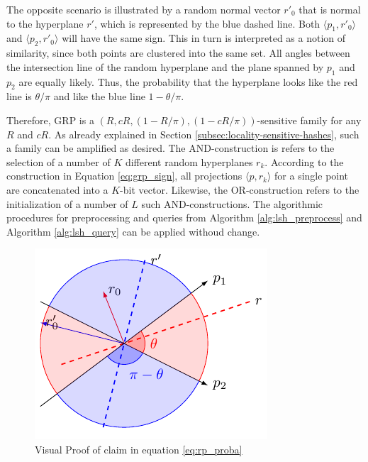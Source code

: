 The opposite scenario is illustrated by a random normal vector $r'_0$ that is normal to the hyperplane $r'$, which is represented by the blue dashed line. Both $\langle p_1, r'_0 \rangle$ and  $\langle p_2, r'_0 \rangle$ will have the same sign. This in turn is interpreted as a notion of similarity, since both points are clustered into the same set. All angles between the intersection line of the random hyperplane and the plane spanned by $p_1$ and $p_2$ are equally likely. Thus, the probability that the hyperplane looks like the red line is $\theta / \pi$ and like the blue line $1 - \theta / \pi$.

Therefore, GRP is a $(R, cR, (1-R/\pi), (1-cR/\pi))$-sensitive family for any $R$ and $cR$. As already explained in Section \ref{subsec:locality-sensitive-hashes}, such a family can be amplified as desired. The AND-construction is refers to the selection of a number of $K$ different random hyperplanes $r_k$. According to the construction in Equation \ref{eq:grp_sign}, all projections $\langle p, r_k \rangle$ for a single point are concatenated into a $K$-bit vector. Likewise, the OR-construction refers to the initialization of a number of $L$ such AND-constructions. The algorithmic procedures for preprocessing and queries from Algorithm \ref{alg:lsh_preprocess} and Algorithm \ref{alg:lsh_query} can be applied withoud change. 

\begin{figure}[t]
    \centering
    \includegraphics[width=0.6\linewidth]{tikz/random_hyperplane_2d.pdf}
    \caption{Visual Proof of claim in equation \ref{eq:rp_proba}}
    \label{fig:rp_2d}
\end{figure}